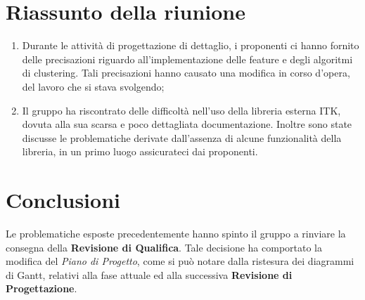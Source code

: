 \section{Riassunto della riunione}
\label{riassunto}
\begin{enumerate}
	\item Durante le attività di progettazione di dettaglio, i proponenti ci hanno fornito delle precisazioni riguardo all'implementazione delle feature\g{} e degli algoritmi di clustering\g{}. Tali precisazioni hanno causato una modifica in corso d'opera, del lavoro che si stava svolgendo;
	\item Il gruppo ha riscontrato delle difficoltà nell'uso della libreria esterna ITK\g{}, dovuta alla sua scarsa e poco dettagliata documentazione. Inoltre sono state discusse le problematiche derivate dall'assenza di alcune funzionalità della libreria, in un primo luogo assicurateci dai proponenti.
\end{enumerate}
\pagebreak
\section{Conclusioni}
Le problematiche esposte precedentemente hanno spinto il gruppo a rinviare la consegna della \textbf{Revisione di Qualifica}. Tale decisione ha comportato la modifica del \textit{Piano di Progetto}, come si può notare dalla ristesura dei diagrammi di Gantt\g{}, relativi alla fase attuale ed alla successiva \textbf{Revisione di Progettazione}.